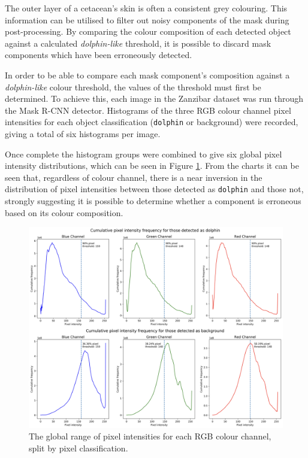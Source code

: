 The outer layer of a cetacean's skin is often a consistent grey colouring. This information can be utilised to filter out noisy components of the mask during post-processing. By comparing the colour composition of each detected object against a calculated \textit{dolphin-like} threshold, it is possible to discard mask components which have been erroneously detected.

In order to be able to compare each mask component's composition against a \textit{dolphin-like} colour threshold, the values of the threshold must first be determined. To achieve this, each image in the Zanzibar dataset was run through the Mask R-CNN detector. Histograms of the three RGB colour channel pixel intensities for each object classification (\texttt{dolphin} or background) were recorded, giving a total of six histograms per image. 

Once complete the histogram groups were combined to give six global pixel intensity distributions, which can be seen in Figure \ref{fig:global-histogram}. From the charts it can be seen that, regardless of colour channel, there is a near inversion in the distribution of pixel intensities between those detected as \texttt{dolphin} and those not, strongly suggesting it is possible to determine whether a component is erroneous based on its colour composition.

\begin{figure}
	\begin{center}
		\includegraphics[scale=0.7]{Chapter5/figs/histogram-updated.png}
	\end{center}
	\caption{The global range of pixel intensities for each RGB colour channel, split by pixel classification.}\label{fig:global-histogram}
\end{figure}

